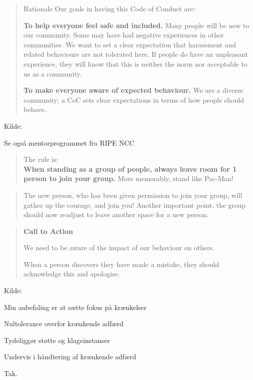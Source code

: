 \documentclass[Screen16to9,17pt]{foils}
\begin{document}
\begin{quote}
Rationale
Our goals in having this Code of Conduct are:
\begin{list2}
\item {\bf To help everyone feel safe and included.} Many people will be new to our community. Some may have had negative experiences in other communities. We want to set a clear expectation that harassment and related behaviours are not tolerated here. If people do have an unpleasant experience, they will know that this is neither the norm nor acceptable to us as a community.

\item {\bf To make everyone aware of expected behaviour.} We are a diverse community; a CoC sets clear expectations in terms of how people should behave.
\end{list2}
\end{quote}
Kilde: {\small
{}}

Se også mentorprogrammet fra RIPE NCC\\{\small
{}}



\begin{quote}
\vskip -1cm The rule is:\\
{\bf When standing as a group of people, always leave room for 1 person to join your group.} \hskip 3cm More memorably, stand like Pac-Man!
\end{quote}


\begin{quote}
The new person, who has been given permission to join your group, will gather up the courage, and join you! Another important point, the group should now readjust to leave another space for a new person.\\
\end{quote}


\begin{quote}
{\bf \LARGE Call to Action}

We need to be aware of the impact of our behaviour on others.

When a person discovers they have made a mistake, they should acknowledge this and apologise.
\end{quote}
Kilde:

Min anbefaling er at sætte fokus på krænkelser
\begin{list2}
\item Nultolerance overfor krænkende adfærd
\item Tydeliggør støtte og klageinstanser
\item Undervis i håndtering af krænkende adfærd
\end{list2}

Tak.
\end{document}
